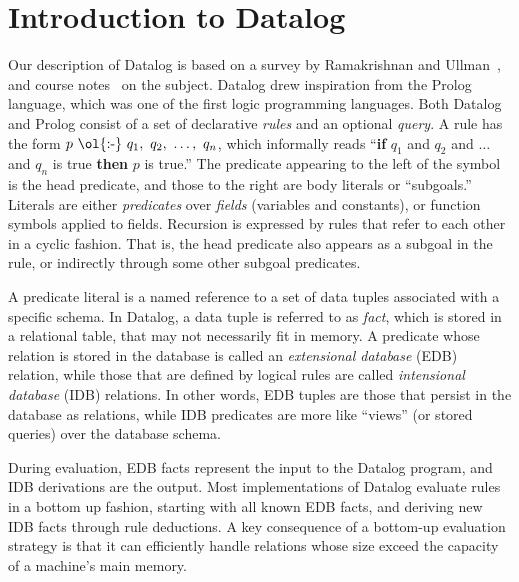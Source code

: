 \section{Introduction to Datalog}
\label{ch:p2:sec:datalog}

Our description of Datalog is based on a survey by Ramakrishnan and
Ullman~\cite{deductive-database}, and course notes~\cite{ullmanNotes} on the
subject.  Datalog drew inspiration from the Prolog language, which was one of
the first logic programming languages.  Both Datalog and Prolog consist of a
set of declarative {\em rules} and an optional {\em query}.  A rule has the
form $p\ \text{\ol{:-}}\ q_1,\ q_2,\ \ldots,\ q_n$, which informally reads
``{\bf if} $q_1$ and $q_2$ and $\ldots$ and $q_n$ is true {\bf then} $p$ is
true.'' The predicate appearing to the left of the \ol{:-} symbol is the head
predicate, and those to the right are body literals or ``subgoals.'' Literals
are either {\em predicates} over {\em fields} (variables and constants), or
function symbols applied to fields.  Recursion is expressed by rules that refer
to each other in a cyclic fashion.  That is, the head predicate also appears as
a subgoal in the rule, or indirectly through some other subgoal predicates.

A predicate literal is a named reference to a set of data tuples associated
with a specific schema.  In Datalog, a data tuple is referred to as {\em fact},
which is stored in a relational table, that may not necessarily fit in memory.
A predicate whose relation is stored in the database is called an {\em
extensional database} (EDB) relation, while those that are defined by logical
rules are called {\em intensional database} (IDB) relations.  In other words,
EDB tuples are those that persist in the database as relations, while IDB
predicates are more like ``views'' (or stored queries) over the database
schema.

During evaluation, EDB facts represent the input to the Datalog program, and
IDB derivations are the output.  Most implementations of Datalog evaluate rules
in a bottom up fashion, starting with all known EDB facts, and deriving new IDB
facts through rule deductions.  A key consequence of a bottom-up evaluation
strategy is that it can efficiently handle relations whose size exceed the
capacity of a machine's main memory.


